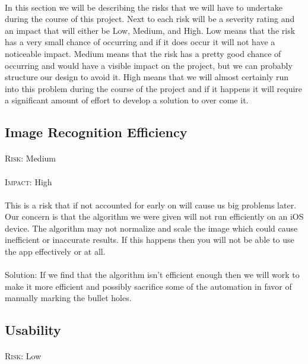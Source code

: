 \paragraph{}In this section we will be describing the risks that we will have to undertake during the course of this project. Next to each risk will be a severity rating and an impact that will either be Low, Medium, and High. Low means that the risk has a very small chance of occurring and if it does occur it will not have a noticeable impact. Medium means that the risk has a pretty good chance of occurring and would have a visible impact on the project, but we can probably structure our design to avoid it. High means that we will almost certainly run into this problem during the course of the project and if it happens it will require a significant amount of effort to develop a solution to over come it.

\subsection{Image Recognition Efficiency}
\paragraph{}\textsc{Risk:} Medium
\paragraph{}\textsc{Impact:} High
\paragraph{} This is a risk that if not accounted for early on will cause us big problems later. Our concern is that the algorithm we were given will not run efficiently on an iOS device. The algorithm may not normalize and scale the image which could cause inefficient or inaccurate results. If this happens then you will not be able to use the app effectively or at all.
\\
\\Solution: If we find that the algorithm isn't efficient enough then we will work to make it more efficient and possibly sacrifice some of the automation in favor of manually marking the bullet holes.

\subsection{Usability}
\paragraph{}\textsc{Risk:} Low
